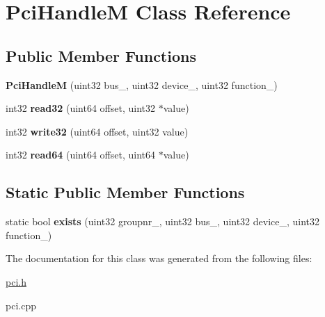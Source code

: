\hypertarget{class_pci_handle_m}{}\section{Pci\+HandleM Class Reference}
\label{class_pci_handle_m}
\subsection*{Public Member Functions}
\begin{DoxyCompactItemize}
\item 
\mbox{\label{class_pci_handle_m_ad067fc750d7b2f05b9e67badbdf237d3}} 
{\bfseries Pci\+HandleM} (uint32 bus\+\_\+, uint32 device\+\_\+, uint32 function\+\_\+)
\item 
\mbox{\label{class_pci_handle_m_ac9257ce7ae864201459f4db8996de7f6}} 
int32 {\bfseries read32} (uint64 offset, uint32 $\ast$value)
\item 
\mbox{\label{class_pci_handle_m_a412df968cfe50c405aa445c2b52bf6b1}} 
int32 {\bfseries write32} (uint64 offset, uint32 value)
\item 
\mbox{\label{class_pci_handle_m_a8fced207ab30a888b09ce361d1a45980}} 
int32 {\bfseries read64} (uint64 offset, uint64 $\ast$value)
\end{DoxyCompactItemize}
\subsection*{Static Public Member Functions}
\begin{DoxyCompactItemize}
\item 
\mbox{\label{class_pci_handle_m_abfddf061727ba8a87c13aafc92be3c20}} 
static bool {\bfseries exists} (uint32 groupnr\+\_\+, uint32 bus\+\_\+, uint32 device\+\_\+, uint32 function\+\_\+)
\end{DoxyCompactItemize}


The documentation for this class was generated from the following files\+:\begin{DoxyCompactItemize}
\item 
\mbox{\hyperlink{pci_8h}{pci.\+h}}\item 
pci.\+cpp\end{DoxyCompactItemize}
